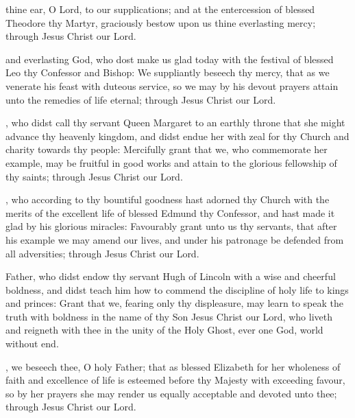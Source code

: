  thine ear, O Lord, to our supplications; and at the entercession of blessed Theodore thy Martyr, graciously bestow upon us thine everlasting mercy; through Jesus Christ our Lord.

 and everlasting God, who dost make us glad today with the festival of blessed Leo thy Confessor and Bishop: We suppliantly beseech thy mercy, that as we venerate his feast with duteous service, so we may by his devout prayers attain unto the remedies of life eternal; through Jesus Christ our Lord.

, who didst call thy servant Queen Margaret to an earthly throne that she might advance thy heavenly kingdom, and didst endue her with zeal for thy Church and charity towards thy people: Mercifully grant that we, who commemorate her example, may be fruitful in good works and attain to the glorious fellowship of thy saints; through Jesus Christ our Lord.

, who according to thy bountiful goodness hast adorned thy Church with the merits of the excellent life of blessed Edmund thy Confessor, and hast made it glad by his glorious miracles: Favourably grant unto us thy servants, that after his example we may amend our lives, and under his patronage be defended from all adversities; through Jesus Christ our Lord.

 Father, who didst endow thy servant Hugh of Lincoln with a wise and cheerful boldness, and didst teach him how to commend the discipline of holy life to kings and princes: Grant that we, fearing only thy displeasure, may learn to speak the truth with boldness in the name of thy Son Jesus Christ our Lord, who liveth and reigneth with thee in the unity of the Holy Ghost, ever one God, world without end.

, we beseech thee, O holy Father; that as blessed Elizabeth for her wholeness of faith and excellence of life is esteemed before thy Majesty with exceeding favour, so by her prayers she may render us equally acceptable and devoted unto thee; through Jesus Christ our Lord.

